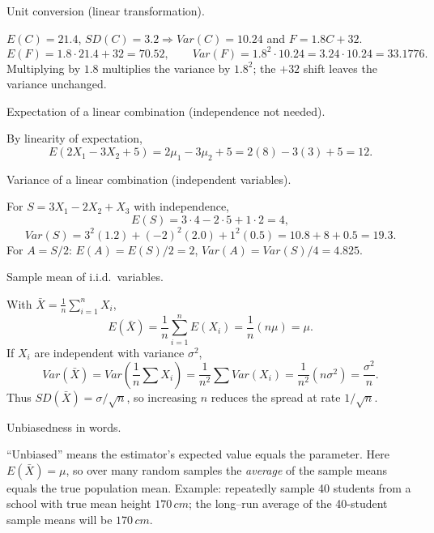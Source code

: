 \documentclass[11pt]{article}
\def\textbf#1{#1}%
\def\mathbb#1{#1}%
\def\mathrm#1{#1}%
\begin{document}
\begin{solution}
\textbf{Unit conversion (linear transformation).}

$\mathbb E(C)=21.4$, $\mathrm{SD}(C)=3.2\Rightarrow \mathrm{Var}(C)=10.24$ and $F=1.8C+32$.
\[
\mathbb E(F)=1.8\cdot21.4+32=\boxed{70.52},\qquad
\mathrm{Var}(F)=1.8^2\cdot 10.24=3.24\cdot 10.24=\boxed{33.1776}.
\]
Multiplying by $1.8$ multiplies the variance by $1.8^2$; the $+32$ shift leaves the variance unchanged.
\end{solution}

\begin{solution}
\textbf{Expectation of a linear combination (independence not needed).}

By linearity of expectation,
\[
\mathbb E(2X_1-3X_2+5)=2\mu_1-3\mu_2+5=2(8)-3(3)+5=\boxed{12}.
\]
\end{solution}

\begin{solution}
\textbf{Variance of a linear combination (independent variables).}

For $S=3X_1-2X_2+X_3$ with independence,
\[
\mathbb E(S)=3\cdot4-2\cdot5+1\cdot2=\boxed{4},
\]
\[
\mathrm{Var}(S)=3^2(1.2)+(-2)^2(2.0)+1^2(0.5)=10.8+8+0.5=\boxed{19.3}.
\]
For $A=S/2$: $\mathbb E(A)=\mathbb E(S)/2=\boxed{2}$, 
$\mathrm{Var}(A)=\mathrm{Var}(S)/4=\boxed{4.825}$.
\end{solution}

\begin{solution}
\textbf{Sample mean of i.i.d.\ variables.}

With $\bar X=\tfrac1n\sum_{i=1}^n X_i$,
\[
\mathbb E(\bar X)=\frac1n\sum_{i=1}^n \mathbb E(X_i)=\frac1n(n\mu)=\boxed{\mu}.
\]
If $X_i$ are independent with variance $\sigma^2$,
\[
\mathrm{Var}(\bar X)=\mathrm{Var}\!\left(\frac1n\sum X_i\right)
=\frac{1}{n^2}\sum \mathrm{Var}(X_i)
=\frac{1}{n^2}(n\sigma^2)=\boxed{\frac{\sigma^2}{n}}.
\]
Thus $\mathrm{SD}(\bar X)=\sigma/\sqrt{n}$, so increasing $n$ reduces the spread at rate $1/\sqrt n$.
\end{solution}

\begin{solution}
\textbf{Unbiasedness in words.}

``Unbiased'' means the estimator's expected value equals the parameter. 
Here $\mathbb{E}(\bar X)=\mu$, so over many random samples the \emph{average} of the sample means equals the true population mean. 
Example: repeatedly sample 40 students from a school with true mean height $170\,\mathrm{cm}$; the long--run average of the 40-student sample means will be $170\,\mathrm{cm}$.

\end{solution}
\end{document}
